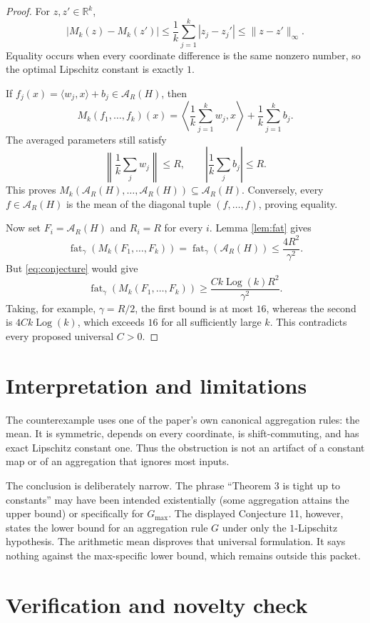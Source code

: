 \documentclass[11pt]{article}
\newcommand{\fat}{\operatorname{fat}}
\newcommand{\Log}{\operatorname{Log}}
\newcommand{\A}{\mathcal A}
\begin{document}
\begin{proof}
For \(z,z'\in\mathbb R^k\),
\[
 |M_k(z)-M_k(z')|
 \leq \frac1k\sum_{j=1}^k|z_j-z_j'|
 \leq \|z-z'\|_\infty.
\]
Equality occurs when every coordinate difference is the same nonzero number,
so the optimal Lipschitz constant is exactly \(1\).

If \(f_j(x)=\langle w_j,x\rangle+b_j\in\A_R(H)\), then
\[
 M_k(f_1,\ldots,f_k)(x)
 =
 \left\langle\frac1k\sum_{j=1}^k w_j,x\right\rangle
 +\frac1k\sum_{j=1}^k b_j.
\]
The averaged parameters still satisfy
\[
 \left\|\frac1k\sum_j w_j\right\|\leq R,
 \qquad
 \left|\frac1k\sum_j b_j\right|\leq R.
\]
This proves
\(M_k(\A_R(H),\ldots,\A_R(H))\subseteq\A_R(H)\).
Conversely, every \(f\in\A_R(H)\) is the mean of the diagonal tuple
\((f,\ldots,f)\), proving equality.

Now set \(F_i=\A_R(H)\) and \(R_i=R\) for every \(i\).  Lemma
\ref{lem:fat} gives
\[
 \fat_\gamma(M_k(F_1,\ldots,F_k))
 =
 \fat_\gamma(\A_R(H))
 \leq \frac{4R^2}{\gamma^2}.
\]
But \eqref{eq:conjecture} would give
\[
 \fat_\gamma(M_k(F_1,\ldots,F_k))
 \geq
 \frac{Ck\Log(k)R^2}{\gamma^2}.
\]
Taking, for example, \(\gamma=R/2\), the first bound is at most \(16\),
whereas the second is \(4Ck\Log(k)\), which exceeds \(16\) for all
sufficiently large \(k\).  This contradicts every proposed universal
\(C>0\).
\end{proof}

\section{Interpretation and limitations}

The counterexample uses one of the paper's own canonical aggregation rules:
the mean.  It is symmetric, depends on every coordinate, is
shift-commuting, and has exact Lipschitz constant one.  Thus the obstruction
is not an artifact of a constant map or of an aggregation that ignores most
inputs.

The conclusion is deliberately narrow.  The phrase ``Theorem 3 is tight up
to constants'' may have been intended existentially (some aggregation
attains the upper bound) or specifically for \(G_{\max}\).  The displayed
Conjecture 11, however, states the lower bound for an aggregation rule \(G\)
under only the \(1\)-Lipschitz hypothesis.  The arithmetic mean disproves
that universal formulation.  It says nothing against the max-specific lower
bound, which remains outside this packet.

\section{Verification and novelty check}
\end{document}
